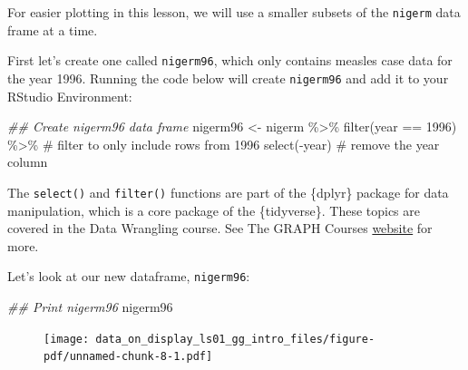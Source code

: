 \documentclass[
  letterpaper,
  DIV=11,
  numbers=noendperiod]{scrreprt}
\newenvironment{Shaded}{\begin{snugshade}}{\end{snugshade}}
\newcommand{\CommentTok}[1]{\textcolor[rgb]{0.37,0.37,0.37}{#1}}
\newcommand{\DecValTok}[1]{\textcolor[rgb]{0.68,0.00,0.00}{#1}}
\newcommand{\DocumentationTok}[1]{\textcolor[rgb]{0.37,0.37,0.37}{\textit{#1}}}
\newcommand{\FunctionTok}[1]{\textcolor[rgb]{0.28,0.35,0.67}{#1}}
\newcommand{\NormalTok}[1]{\textcolor[rgb]{0.00,0.23,0.31}{#1}}
\newcommand{\OtherTok}[1]{\textcolor[rgb]{0.00,0.23,0.31}{#1}}
\newcommand{\SpecialCharTok}[1]{\textcolor[rgb]{0.37,0.37,0.37}{#1}}
\begin{document}
For easier plotting in this lesson, we will use a smaller subsets of the
\texttt{nigerm} data frame at a time.

First let's create one called \texttt{nigerm96}, which only contains
measles case data for the year 1996. Running the code below will create
\texttt{nigerm96} and add it to your RStudio Environment:

\begin{Shaded}
\begin{Highlighting}[]
\DocumentationTok{\#\# Create nigerm96 data frame}
\NormalTok{nigerm96 }\OtherTok{\textless{}{-}}\NormalTok{ nigerm }\SpecialCharTok{\%\textgreater{}\%}   
  \FunctionTok{filter}\NormalTok{(year }\SpecialCharTok{==} \DecValTok{1996}\NormalTok{)  }\SpecialCharTok{\%\textgreater{}\%} \CommentTok{\# filter to only include rows from 1996}
  \FunctionTok{select}\NormalTok{(}\SpecialCharTok{{-}}\NormalTok{year) }\CommentTok{\# remove the year column}
\end{Highlighting}
\end{Shaded}

\begin{tcolorbox}[enhanced jigsaw, colframe=quarto-callout-note-color-frame, colbacktitle=quarto-callout-note-color!10!white, titlerule=0mm, opacitybacktitle=0.6, breakable, toprule=.15mm, arc=.35mm, rightrule=.15mm, colback=white, bottomrule=.15mm, opacityback=0, toptitle=1mm, left=2mm, bottomtitle=1mm, title=\textcolor{quarto-callout-note-color}{\faInfo}\hspace{0.5em}{Reminder}, leftrule=.75mm, coltitle=black]

The \texttt{select()} and \texttt{filter()} functions are part of the
\{dplyr\} package for data manipulation, which is a core package of the
\{tidyverse\}. These topics are covered in the Data Wrangling course.
See The GRAPH Courses \href{https://thegraphcourses.org/}{website} for
more.

\end{tcolorbox}

Let's look at our new dataframe, \texttt{nigerm96}:

\begin{Shaded}
\begin{Highlighting}[]
\DocumentationTok{\#\# Print nigerm96}
\NormalTok{nigerm96}
\end{Highlighting}
\end{Shaded}

\begin{figure}[H]

{\centering \texttt{[image: data\_on\_display\_ls01\_gg\_intro\_files/figure-pdf/unnamed-chunk-8-1.pdf]}

}

\end{figure}
\end{document}
